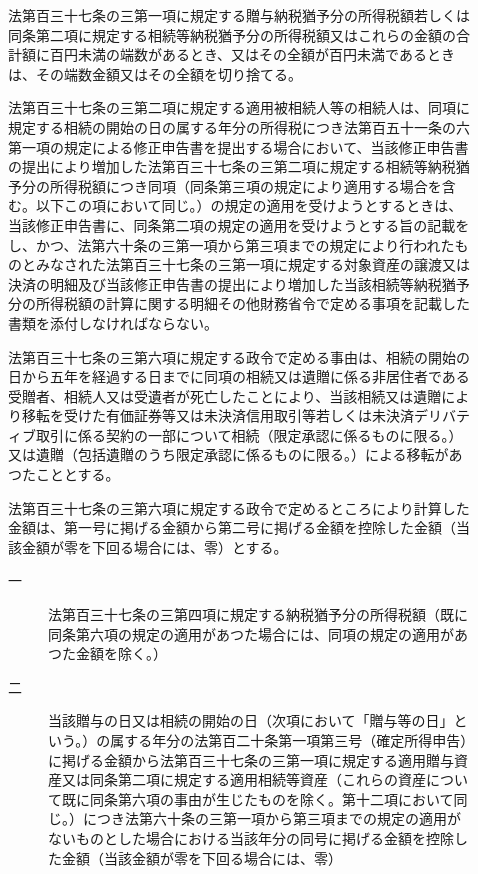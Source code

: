 \documentclass[twocolumn,a4j,10pt]{ltjtarticle}
\begin{document}
\begin{description}
\item[]法第百三十七条の三第一項に規定する贈与納税猶予分の所得税額若しくは同条第二項に規定する相続等納税猶予分の所得税額又はこれらの金額の合計額に百円未満の端数があるとき、又はその全額が百円未満であるときは、その端数金額又はその全額を切り捨てる。
\item[]法第百三十七条の三第二項に規定する適用被相続人等の相続人は、同項に規定する相続の開始の日の属する年分の所得税につき法第百五十一条の六第一項の規定による修正申告書を提出する場合において、当該修正申告書の提出により増加した法第百三十七条の三第二項に規定する相続等納税猶予分の所得税額につき同項（同条第三項の規定により適用する場合を含む。以下この項において同じ。）の規定の適用を受けようとするときは、当該修正申告書に、同条第二項の規定の適用を受けようとする旨の記載をし、かつ、法第六十条の三第一項から第三項までの規定により行われたものとみなされた法第百三十七条の三第一項に規定する対象資産の譲渡又は決済の明細及び当該修正申告書の提出により増加した当該相続等納税猶予分の所得税額の計算に関する明細その他財務省令で定める事項を記載した書類を添付しなければならない。
\item[]法第百三十七条の三第六項に規定する政令で定める事由は、相続の開始の日から五年を経過する日までに同項の相続又は遺贈に係る非居住者である受贈者、相続人又は受遺者が死亡したことにより、当該相続又は遺贈により移転を受けた有価証券等又は未決済信用取引等若しくは未決済デリバティブ取引に係る契約の一部について相続（限定承認に係るものに限る。）又は遺贈（包括遺贈のうち限定承認に係るものに限る。）による移転があつたこととする。
\item[]法第百三十七条の三第六項に規定する政令で定めるところにより計算した金額は、第一号に掲げる金額から第二号に掲げる金額を控除した金額（当該金額が零を下回る場合には、零）とする。
\begin{description}
\item[一]法第百三十七条の三第四項に規定する納税猶予分の所得税額（既に同条第六項の規定の適用があつた場合には、同項の規定の適用があつた金額を除く。）
\item[二]当該贈与の日又は相続の開始の日（次項において「贈与等の日」という。）の属する年分の法第百二十条第一項第三号（確定所得申告）に掲げる金額から法第百三十七条の三第一項に規定する適用贈与資産又は同条第二項に規定する適用相続等資産（これらの資産について既に同条第六項の事由が生じたものを除く。第十二項において同じ。）につき法第六十条の三第一項から第三項までの規定の適用がないものとした場合における当該年分の同号に掲げる金額を控除した金額（当該金額が零を下回る場合には、零）
\end{description}

\end{description}
\end{document}
